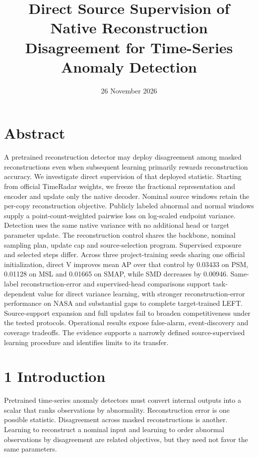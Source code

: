 \documentclass[
  english,
  10pt,
]{article}
\title{Direct Source Supervision of Native Reconstruction Disagreement
for Time-Series Anomaly Detection}
\author{}
\date{26 November 2026}
\begin{document}
\maketitle

\section{Abstract}\label{abstract}

A pretrained reconstruction detector may deploy disagreement among
masked reconstructions even when subsequent learning primarily rewards
reconstruction accuracy. We investigate direct supervision of that
deployed statistic. Starting from official TimeRadar weights, we freeze
the fractional representation and encoder and update only the native
decoder. Nominal source windows retain the per-copy reconstruction
objective. Publicly labeled abnormal and normal windows supply a
point-count-weighted pairwise loss on log-scaled endpoint variance.
Detection uses the same native variance with no additional head or
target parameter update. The reconstruction control shares the backbone,
nominal sampling plan, update cap and source-selection program.
Supervised exposure and selected steps differ. Across three
project-training seeds sharing one official initialization, direct V
improves mean AP over that control by 0.03433 on PSM, 0.01128 on MSL and
0.01665 on SMAP, while SMD decreases by 0.00946. Same-label
reconstruction-error and supervised-head comparisons support
task-dependent value for direct variance learning, with stronger
reconstruction-error performance on NASA and substantial gaps to
complete target-trained LEFT. Source-support expansion and full updates
fail to broaden competitiveness under the tested protocols. Operational
results expose false-alarm, event-discovery and coverage tradeoffs. The
evidence supports a narrowly defined source-supervised learning
procedure and identifies limits to its transfer.

\section{1 Introduction}\label{introduction}

Pretrained time-series anomaly detectors must convert internal outputs
into a scalar that ranks observations by abnormality. Reconstruction
error is one possible statistic. Disagreement across masked
reconstructions is another. Learning to reconstruct a nominal input and
learning to order abnormal observations by disagreement are related
objectives, but they need not favor the same parameters.
\end{document}

